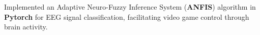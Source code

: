 \item{Implemented an Adaptive Neuro-Fuzzy Inference System (\textbf{ANFIS}) algorithm in \textbf{Pytorch} for EEG signal classification, facilitating video game control through brain activity.}


